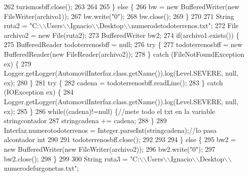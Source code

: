 \begin{DoxyCode}
262 \textcolor{comment}{                turismosbff.close();}
263 \textcolor{comment}{                }
264 \textcolor{comment}{            }
265 \textcolor{comment}{        \} else \{}
266 \textcolor{comment}{            bw = new BufferedWriter(new FileWriter(archivo1));}
267 \textcolor{comment}{            bw.write("0");}
268 \textcolor{comment}{            bw.close();}
269 \textcolor{comment}{        \}}
270 \textcolor{comment}{        }
271 \textcolor{comment}{        String ruta2 = "C:\(\backslash\)\(\backslash\)Users\(\backslash\)\(\backslash\)Ignacio\(\backslash\)\(\backslash\)Desktop\(\backslash\)\(\backslash\)numerodetodoterrenos.txt";}
272 \textcolor{comment}{        File archivo2 = new File(ruta2);}
273 \textcolor{comment}{        BufferedWriter bw2;}
274 \textcolor{comment}{        if(archivo1.exists()) \{}
275 \textcolor{comment}{            BufferedReader todoterrenosbff = null;}
276 \textcolor{comment}{                    try \{}
277 \textcolor{comment}{                        todoterrenosbff = new BufferedReader(new FileReader(archivo2));}
278 \textcolor{comment}{                    \} catch (FileNotFoundException ex) \{}
279 \textcolor{comment}{                        Logger.getLogger(AutomovilInterfaz.class.getName()).log(Level.SEVERE, null, ex);}
280 \textcolor{comment}{                    \}}
281 \textcolor{comment}{                    try \{}
282 \textcolor{comment}{                        cadena = todoterrenosbff.readLine();}
283 \textcolor{comment}{                    \} catch (IOException ex) \{}
284 \textcolor{comment}{                        Logger.getLogger(AutomovilInterfaz.class.getName()).log(Level.SEVERE, null, ex);}
285 \textcolor{comment}{                    \}}
286 \textcolor{comment}{                while((cadena)!=null) \{//mete todo el txt en la variable stringcontador}
287 \textcolor{comment}{                        stringcadena += cadena;}
288 \textcolor{comment}{                    \}}
289 \textcolor{comment}{                Interfaz.numerotodoterrenos = Integer.parseInt(stringcadena);//lo pasa alcontador int }
290 \textcolor{comment}{                }
291 \textcolor{comment}{                todoterrenosbff.close();}
292 \textcolor{comment}{                }
293 \textcolor{comment}{            }
294 \textcolor{comment}{        \} else \{}
295 \textcolor{comment}{            bw2 = new BufferedWriter(new FileWriter(archivo2));}
296 \textcolor{comment}{            bw2.write("0");}
297 \textcolor{comment}{            bw2.close();}
298 \textcolor{comment}{        \}}
299 \textcolor{comment}{        }
300 \textcolor{comment}{        String ruta3 = "C:\(\backslash\)\(\backslash\)Users\(\backslash\)\(\backslash\)Ignacio\(\backslash\)\(\backslash\)Desktop\(\backslash\)\(\backslash\)numerodefurgonetas.txt";}

\end{DoxyCode}
